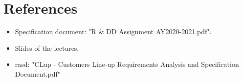 \chapter{References}

\begin{itemize}
    \item Specification document: "R \& DD Assignment AY2020-2021.pdf".
    \item Slides of the lectures.
    \item \gls{rasd}: "CLup - Customers Line-up Requirements Analysis and Specification Document.pdf"
\end{itemize}